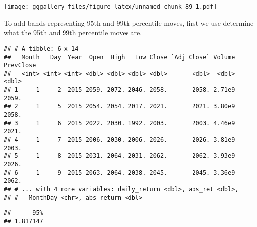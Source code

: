 \documentclass[]{book}
\newenvironment{Shaded}{\begin{snugshade}}{\end{snugshade}}
\newcommand{\FloatTok}[1]{\textcolor[rgb]{0.00,0.00,0.81}{#1}}
\newcommand{\KeywordTok}[1]{\textcolor[rgb]{0.13,0.29,0.53}{\textbf{#1}}}
\newcommand{\NormalTok}[1]{#1}
\newcommand{\OperatorTok}[1]{\textcolor[rgb]{0.81,0.36,0.00}{\textbf{#1}}}
\newcommand{\StringTok}[1]{\textcolor[rgb]{0.31,0.60,0.02}{#1}}
\begin{document}
\texttt{[image: gggallery\_files/figure-latex/unnamed-chunk-89-1.pdf]}

To add bands representing 95th and 99th percentile moves, first we use determine what the 95th and 99th percentile moves are.

\begin{Shaded}
\end{Shaded}

\begin{verbatim}
## # A tibble: 6 x 14
##   Month   Day  Year  Open  High   Low Close `Adj Close` Volume PrevClose
##   <int> <int> <int> <dbl> <dbl> <dbl> <dbl>       <dbl>  <dbl>     <dbl>
## 1     1     2  2015 2059. 2072. 2046. 2058.       2058. 2.71e9     2059.
## 2     1     5  2015 2054. 2054. 2017. 2021.       2021. 3.80e9     2058.
## 3     1     6  2015 2022. 2030. 1992. 2003.       2003. 4.46e9     2021.
## 4     1     7  2015 2006. 2030. 2006. 2026.       2026. 3.81e9     2003.
## 5     1     8  2015 2031. 2064. 2031. 2062.       2062. 3.93e9     2026.
## 6     1     9  2015 2063. 2064. 2038. 2045.       2045. 3.36e9     2062.
## # ... with 4 more variables: daily_return <dbl>, abs_ret <dbl>,
## #   MonthDay <chr>, abs_return <dbl>
\end{verbatim}

\begin{Shaded}
\end{Shaded}

\begin{verbatim}
##      95% 
## 1.817147
\end{verbatim}

\begin{Shaded}
\end{Shaded}
\end{document}
